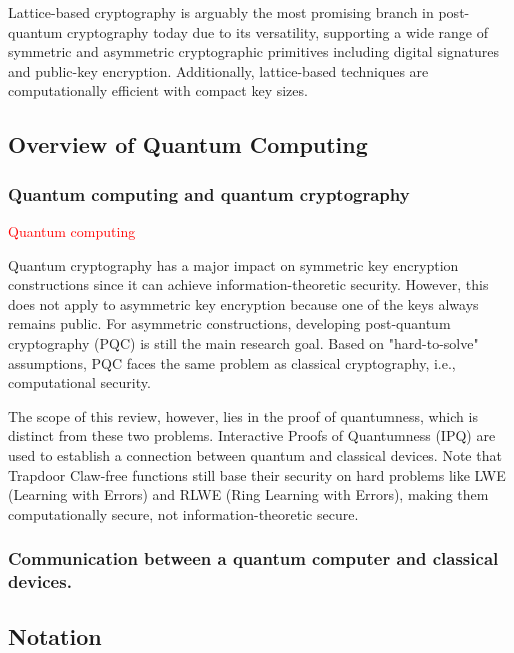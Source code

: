 Lattice-based cryptography is arguably the most promising branch in post-quantum cryptography today due to its versatility, supporting a wide range of symmetric and asymmetric cryptographic primitives including digital signatures and public-key encryption. Additionally, lattice-based techniques are computationally efficient with compact key sizes.

\subsection{Overview of Quantum Computing}

\subsubsection{Quantum computing and quantum cryptography}

\textcolor{red}{Quantum computing}

Quantum cryptography has a major impact on symmetric key encryption constructions since it can achieve information-theoretic security. However, this does not apply to asymmetric key encryption because one of the keys always remains public. For asymmetric constructions, developing post-quantum cryptography (PQC) is still the main research goal. Based on "hard-to-solve" assumptions, PQC faces the same problem as classical cryptography, i.e., computational security.

The scope of this review, however, lies in the proof of quantumness, which is distinct from these two problems. Interactive Proofs of Quantumness (IPQ) are used to establish a connection between quantum and classical devices. Note that Trapdoor Claw-free functions still base their security on hard problems like LWE (Learning with Errors) and RLWE (Ring Learning with Errors), making them computationally secure, not information-theoretic secure.
\subsubsection{Communication between a quantum computer and classical devices.}

\subsection{Notation}

